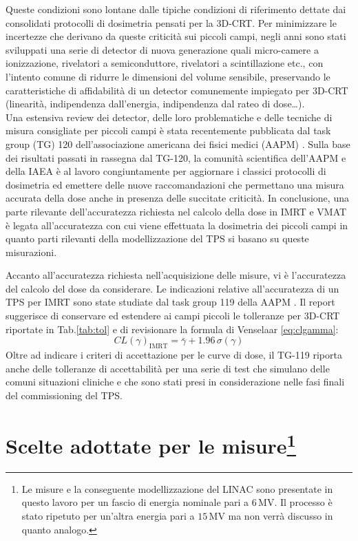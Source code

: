 Queste condizioni sono lontane dalle tipiche condizioni di riferimento dettate dai consolidati protocolli di dosimetria \cite{Almond1999,Andreo2006} pensati per la 3D-CRT. Per minimizzare le incertezze che derivano da queste criticità sui piccoli campi, negli anni sono stati sviluppati una serie di detector di nuova generazione quali micro-camere a ionizzazione, rivelatori a semiconduttore, rivelatori a scintillazione etc., con l'intento comune di ridurre le dimensioni del volume sensibile, preservando le caratteristiche di affidabilità di un detector comunemente impiegato per 3D-CRT (linearità, indipendenza dall'energia, indipendenza dal rateo di dose\ldots).\\
Una estensiva review dei detector, delle loro problematiche e delle tecniche di misura consigliate per piccoli campi è stata recentemente pubblicata dal task group (TG) 120 dell'associazione americana dei fisici medici (AAPM) \cite{Low2011}. Sulla base dei risultati passati in rassegna dal TG-120, la comunità scientifica dell'AAPM e della IAEA è al lavoro congiuntamente per aggiornare i classici protocolli di dosimetria ed emettere delle nuove raccomandazioni che permettano una misura accurata della dose anche in presenza delle succitate criticità. In conclusione, una parte rilevante dell'accuratezza richiesta nel calcolo della dose in IMRT e VMAT è legata all'accuratezza con cui viene effettuata la dosimetria dei piccoli campi in quanto parti rilevanti della modellizzazione del TPS si basano su queste misurazioni.

Accanto all'accuratezza richiesta nell'acquisizione delle misure, vi è l'accuratezza del calcolo del dose da considerare. Le indicazioni relative all'accuratezza di un TPS per IMRT sono state studiate dal task group 119 della AAPM \cite{Ezzell2009}. Il report suggerisce di conservare ed estendere ai campi piccoli le tolleranze per 3D-CRT riportate in Tab.\ref{tab:tol} e di revisionare la formula di Venselaar \eqref{eq:clgamma}:
\begin{equation}
CL(\gamma)_{\text{IMRT}} = \bar{\gamma} + 1.96\,\sigma(\gamma)
\end{equation}
Oltre ad indicare i criteri di accettazione per le curve di dose, il TG-119 riporta anche delle tolleranze di accettabilità per una serie di test che simulano delle comuni situazioni cliniche e che sono stati presi in considerazione nelle fasi finali del commissioning del TPS. 

\section[Scelte adottate per le misure]{Scelte adottate per le misure\protect\footnote{Le misure e la conseguente modellizzazione del LINAC sono presentate in questo lavoro per un fascio di energia nominale pari a $6\,$MV. Il processo è stato ripetuto per un'altra energia pari a $15\,$MV ma non verrà discusso in quanto analogo.}}


